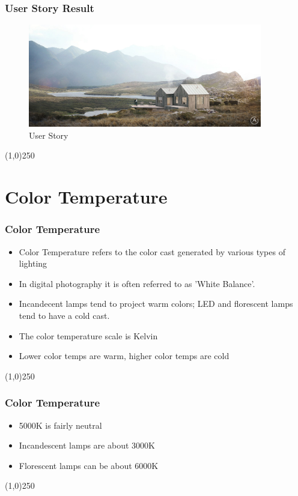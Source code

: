 \begin{frame}
\frametitle{User Story Result}
\begin{figure}
	\centering
		\includegraphics[height=4.5cm]{img/cabana_01_large.jpg}
	\caption{User Story}
	\label{fig:Cabana}
\end{figure}
\end{frame}
\begin{center}\line(1,0){250}\end{center}


\section{Color Temperature}

\begin{frame}
\frametitle{Color Temperature}
\begin{itemize}
	\item Color Temperature refers to the color cast generated by various types of lighting
	\item In digital photography it is often referred to as 'White Balance'.
	\item Incandecent lamps tend to project warm colors; LED and florescent lamps tend to have a cold cast.
	\item The color temperature scale is Kelvin
	\item Lower color temps are warm, higher color temps are cold
\end{itemize}
\end{frame}
\begin{center}\line(1,0){250}\end{center}

\begin{frame}
\frametitle{Color Temperature}
\begin{itemize}
	\item 5000K is fairly neutral
	\item Incandescent lamps are about 3000K
	\item Florescent lamps can be about 6000K
\end{itemize}
\end{frame}
\begin{center}\line(1,0){250}\end{center}



